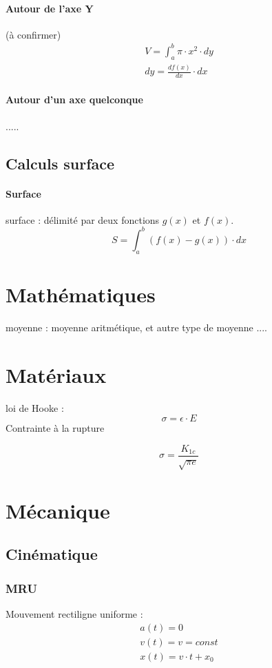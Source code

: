 \documentclass[12pt,a4paper,twoside]{article}
\numberwithin{equation}{subsection}
\begin{document}
\paragraph{Autour de l'axe Y}
(à confirmer)
\begin{eqnarray}
V=\int_{a}^{b}\pi \cdot x^2 \cdot dy\\
dy=\frac{df(x)}{dx}\cdot dx
\end{eqnarray}
\paragraph{Autour d'un axe quelconque}
.....
\subsection{Calculs surface}
\paragraph{Surface}
surface : délimité par deux fonctions $g(x)$ et $f(x)$. 
\begin{equation}
S=\int_{a}^{b} (f(x)-g(x)) \cdot dx
\end{equation}
\newpage
\section{Mathématiques}
moyenne : moyenne aritmétique, et autre type de moyenne ....

\newpage
\section{Matériaux}
loi de Hooke :
\begin{equation}
\sigma = \epsilon \cdot E 
\end{equation}
Contrainte à la rupture 

\begin{equation}
\sigma=\frac{K_{1c}}{\sqrt{\pi e}}
\end{equation}


\newpage
\section{Mécanique}


\subsection{Cinématique}
\subsubsection{MRU}
Mouvement rectiligne uniforme :
\begin{eqnarray}
a(t)=0\\
v(t)=v=const\\
x(t)=v \cdot t + x_0
\end{eqnarray}
\end{document}
